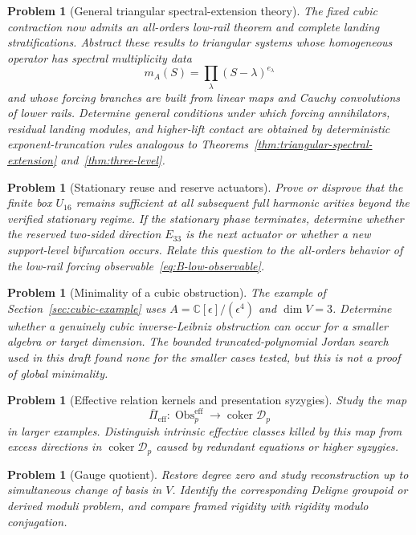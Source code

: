 \documentclass[11pt]{amsart}
\newtheorem{problem}[theorem]{Problem}
\newcommand{\coker}{\operatorname{coker}}
\newcommand{\Obs}{\operatorname{Obs}}
\newcommand{\cD}{\mathscr D}
\newcommand{\C}{\mathbb C}
\begin{document}
\begin{problem}[General triangular spectral-extension theory]
The fixed cubic contraction now admits an all-orders low-rail theorem and complete landing stratifications.  Abstract these results to triangular systems whose homogeneous operator has spectral multiplicity data
\[
m_A(S)=\prod_\lambda(S-\lambda)^{e_\lambda}
\]
and whose forcing branches are built from linear maps and Cauchy convolutions of lower rails.  Determine general conditions under which forcing annihilators, residual landing modules, and higher-lift contact are obtained by deterministic exponent-truncation rules analogous to Theorems~\ref{thm:triangular-spectral-extension} and~\ref{thm:three-level}.
\end{problem}

\begin{problem}[Stationary reuse and reserve actuators]
Prove or disprove that the finite box $U_{16}$ remains sufficient at all subsequent full harmonic arities beyond the verified stationary regime.  If the stationary phase terminates, determine whether the reserved two-sided direction $E_{33}$ is the next actuator or whether a new support-level bifurcation occurs.  Relate this question to the all-orders behavior of the low-rail forcing observable~\eqref{eq:B-low-observable}.
\end{problem}

\begin{problem}[Minimality of a cubic obstruction]
The example of Section~\ref{sec:cubic-example} uses $A=\C[\epsilon]/(\epsilon^4)$ and $\dim V=3$.  Determine whether a genuinely cubic inverse-Leibniz obstruction can occur for a smaller algebra or target dimension.  The bounded truncated-polynomial Jordan search used in this draft found none for the smaller cases tested, but this is not a proof of global minimality.
\end{problem}

\begin{problem}[Effective relation kernels and presentation syzygies]
Study the map
\[
\overline\Pi_{\mathrm{eff}}:\Obs^{\mathrm{eff}}_p\longrightarrow\coker\cD_p
\]
in larger examples.  Distinguish intrinsic effective classes killed by this map from excess directions in $\coker\cD_p$ caused by redundant equations or higher syzygies.
\end{problem}

\begin{problem}[Gauge quotient]
Restore degree zero and study reconstruction up to simultaneous change of basis in $V$.  Identify the corresponding Deligne groupoid or derived moduli problem, and compare framed rigidity with rigidity modulo conjugation.
\end{problem}
\end{document}
